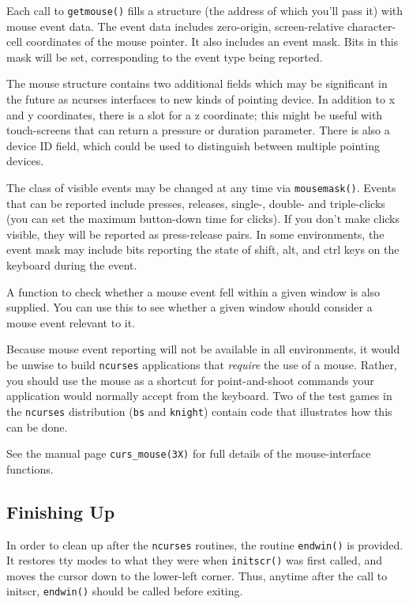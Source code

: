 Each call to \texttt{getmouse()} fills a structure (the address of which you'll
pass it) with mouse event data.  The event data includes zero-origin,
screen-relative character-cell coordinates of the mouse pointer.  It also
includes an event mask.  Bits in this mask will be set, corresponding
to the event type being reported. 

The mouse structure contains two additional fields which may be
significant in the future as ncurses interfaces to new kinds of
pointing device.  In addition to x and y coordinates, there is a slot
for a z coordinate; this might be useful with touch-screens that can
return a pressure or duration parameter.  There is also a device ID
field, which could be used to distinguish between multiple pointing
devices. 

The class of visible events may be changed at any time via \texttt{mousemask()}.
Events that can be reported include presses, releases, single-, double- and
triple-clicks (you can set the maximum button-down time for clicks).  If
you don't make clicks visible, they will be reported as press-release
pairs.  In some environments, the event mask may include bits reporting
the state of shift, alt, and ctrl keys on the keyboard during the event. 

A function to check whether a mouse event fell within a given window is
also supplied.  You can use this to see whether a given window should
consider a mouse event relevant to it. 

Because mouse event reporting will not be available in all
environments, it would be unwise to build \texttt{ncurses}
applications that \emph{require} the use of a mouse.  Rather, you should
use the mouse as a shortcut for point-and-shoot commands your application
would normally accept from the keyboard.  Two of the test games in the
\texttt{ncurses} distribution (\texttt{bs} and \texttt{knight}) contain
code that illustrates how this can be done. 

See the manual page \texttt{curs\_mouse(3X)} for full details of the
mouse-interface functions.

\subsection{Finishing Up}

\label{f0:finishing}In order to clean up after the \texttt{ncurses} routines, the routine
\texttt{endwin()} is provided.  It restores tty modes to what they were when
\texttt{initscr()} was first called, and moves the cursor down to the
lower-left corner.  Thus, anytime after the call to initscr, \texttt{endwin()}
should be called before exiting.

